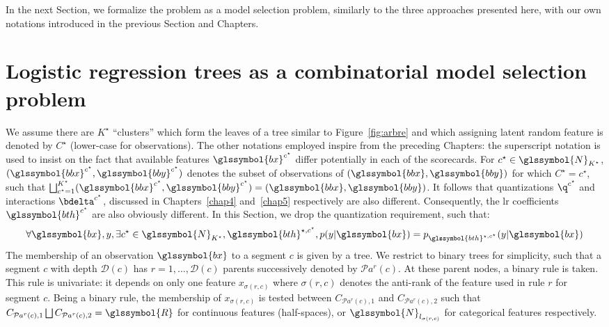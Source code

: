 In the next Section, we formalize the problem as a model selection problem, similarly to the three approaches presented here, with our own notations introduced in the previous Section and Chapters.


\section{Logistic regression trees as a combinatorial model selection problem} \label{sec:model_selec_tree}

We assume there are $K^\star$ ``clusters'' which form the leaves of a tree similar to Figure~\ref{fig:arbre} and which assigning latent random feature is denoted by $C^\star$ (lower-case for observations). The other notations employed inspire from the preceding Chapters: the superscript notation is used to insist on the fact that available features $\glssymbol{bx}^{c^\star}$ differ potentially in each of the scorecards. For $c^\star \in \glssymbol{N}_{K^\star}$, $(\glssymbol{bbx}^{c^\star}, \glssymbol{bby}^{c^\star})$ denotes the subset of observations of $(\glssymbol{bbx}, \glssymbol{bby})$ for which $C^\star = c^\star$, such that $ \bigsqcup_{c^\star=1}^{K^\star} (\glssymbol{bbx}^{c^\star}, \glssymbol{bby}^{c^\star}) = (\glssymbol{bbx}, \glssymbol{bby})$. It follows that quantizations $\q^{c^\star}$ and interactions $\bdelta^{c^\star}$, discussed in Chapters~\ref{chap4} and~\ref{chap5} respectively are also different. Consequently, the \gls{lr} coefficients $\glssymbol{bth}^{c^\star}$ are also obviously different. In this Section, we drop the quantization requirement, such that:
\begin{equation} \label{eq:lr_tree}
\forall \glssymbol{bx}, y, \exists c^\star \in \glssymbol{N}_{K^\star}, \glssymbol{bth}^{\star,c^\star}, p(y | \glssymbol{bx}) = p_{\glssymbol{bth}^{\star,c^\star}}(y | \glssymbol{bx})
\end{equation}
The membership of an observation $\glssymbol{bx}$ to a segment $c$ is given by a tree. We restrict to binary trees for simplicity, such that a segment $c$ with depth $\mathcal{D}(c)$ has $r = 1, \dots, \mathcal{D}(c)$ parents successively denoted by $\mathcal{P}a^r(c)$. At these parent nodes, a binary rule is taken. This rule is univariate: it depends on only one feature $x_{\sigma(r,c)}$ where $\sigma(r,c)$ denotes the anti-rank of the feature used in rule $r$ for segment $c$. Being a binary rule, the membership of $x_{\sigma(r,c)}$ is tested between $C_{\mathcal{P}a^r(c),1}$ and $C_{\mathcal{P}a^r(c),2}$ such that $C_{\mathcal{P}a^r(c),1} \bigsqcup C_{\mathcal{P}a^r(c),2} =\glssymbol{R}$ for continuous features (half-spaces), or $\glssymbol{N}_{l_{\sigma(r,c)}}$ for categorical features respectively. 

